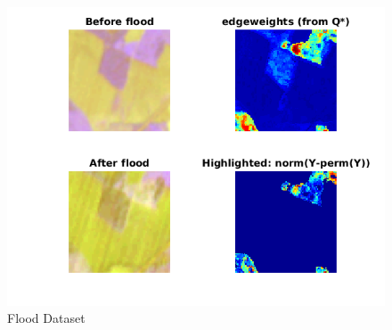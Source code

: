 \documentclass[12pt]{article}
\begin{document}
\begin{figure}
  \centering
  \includegraphics[width=\textwidth]{./FloodFeatureComparison.png}
  \caption{Flood Dataset}
\end{figure}
\end{document}
